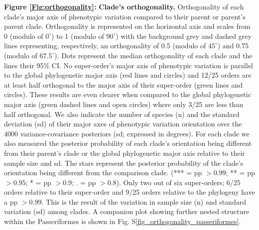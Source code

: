 \documentclass[12pt,letterpaper]{article}
\begin{document}
\noindent \textbf{Figure \ref{Fig:orthogonality}:}
\textbf{Clade's orthogonality.}
Orthogonality of each clade's major axis of phenotypic variation compared to their parent or parent's parent clade.
Orthogonality is represented on the horizontal axis and scales from 0 (modulo of $0^\circ$) to 1 (modulo of $90^\circ$) with the background grey and dashed grey lines representing, respectively, an orthogonality of 0.5 (modulo of $45^\circ$) and 0.75 (modulo of $67.5^\circ$).
Dots represent the median orthogonality of each clade and the lines their 95\% CI.
No super-order's major axis of phenotypic variation is parallel to the global phylogenetic major axis (red lines and circles) and 12/25 orders are at least half orthogonal to the major axis of their super-order (green lines and circles).
These results are even clearer when compared to the global phylogenetic major axis (green dashed lines and open circles) where only 3/25 are less than half orthogonal.
We also indicate the number of species (n) and the standard deviation (sd) of their major axes of phenotypic variation orientation over the 4000 variance-covariance posteriors (sd; expressed in degrees).
For each clade we also measured the posterior probability of each clade's orientation being different from their parent's clade or the global phylogenetic major axis relative to their sample size and sd.
The stars represent the posterior probability of the clade's orientation being different from the comparison clade. (*** = pp $> 0.99$; ** = pp $>0.95$; * = pp $> 0.9$; . = pp $> 0.8$).
Only two out of six super-orders; 6/25 orders relative to their super-order and 9/25 orders relative to the phylogeny have a pp $> 0.99$.
This is the result of the variation in sample size (n) and standard variation (sd) among clades. 
A companion plot showing further nested structure within the Passeriformes is shown in Fig. S\ref{fig_orthogonality_passeriformes}.

\bigskip
\end{document}
